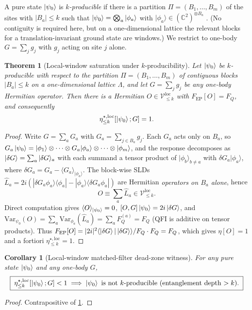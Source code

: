 \documentclass[11pt,a4paper]{article}
\newcommand{\FQ}{F_Q}
\newcommand{\FEP}{F_{\mathrm{EP}}}
\newcommand{\Var}{\mathrm{Var}}
\newcommand{\SLD}{\hat{L}}
\newcommand{\PsiZ}{\ket{\psi_0}}
\newcommand{\dG}{\ket{\delta G}}
\newcommand{\Vloc}[1]{\mathcal{V}^{\mathrm{loc}}_{\le #1}}
\newcommand{\etaloc}[1]{\eta^{\star,\mathrm{loc}}_{\le #1}}
\newtheorem{theorem}{Theorem}
\newtheorem{corollary}{Corollary}
\begin{document}
A pure state $\PsiZ$ is \emph{$k$-producible} if there is a
partition $\Pi=(B_1,\dots,B_m)$ of the sites with $|B_a|\le k$
such that $\PsiZ=\bigotimes_a|\phi_a\rangle$ with
$|\phi_a\rangle\in(\mathbb C^2)^{\otimes B_a}$
\cite{Guhne2005,Sorensen2001,Hyllus2012,Toth2012}.  (No
contiguity is required here, but on a one-dimensional lattice the
relevant blocks for a translation-invariant ground state are
windows.)  We restrict to one-body $G=\sum_jg_j$ with $g_j$
acting on site $j$ alone.

\begin{theorem}[Local-window saturation under $k$-producibility]
\label{thm:saturation}
Let $\PsiZ$ be $k$-producible with respect to the partition
$\Pi=(B_1,\dots,B_m)$ of contiguous blocks $|B_a|\le k$ on a
one-dimensional lattice $\Lambda$, and let $G=\sum_jg_j$ be any
one-body Hermitian operator.  Then there is a Hermitian
$O\in\Vloc{k}$ with $\FEP[O]=\FQ$, and consequently
\begin{equation}
   \etaloc{k}[\PsiZ;G]=1.
\end{equation}
\end{theorem}
\begin{proof}
Write $G=\sum_aG_a$ with $G_a=\sum_{j\in B_a}g_j$.  Each
$G_a$ acts only on $B_a$, so $G_a\PsiZ=
|\phi_1\rangle\otimes\dots\otimes G_a|\phi_a\rangle\otimes\dots
\otimes|\phi_m\rangle$, and the response decomposes as
$\dG=\sum_a|\delta G\rangle_a$ with each summand a tensor product
of $|\phi_b\rangle_{b\neq a}$ with $\delta G_a|\phi_a\rangle$,
where $\delta G_a=G_a-\langle G_a\rangle_{|\phi_a\rangle}$.
The block-wise SLDs $\SLD_a=2i(|\delta G_a\phi_a\rangle\langle\phi_a|-
|\phi_a\rangle\langle\delta G_a\phi_a|)$ are Hermitian
\emph{operators on $B_a$ alone}, hence
\begin{equation}
   O\equiv\sum_a\SLD_a\in\Vloc{k}.
\end{equation}
Direct computation gives
$\langle O\rangle_{\PsiZ}=0$,
$[O,G]\PsiZ=2i\dG$, and
$\Var_{\psi_0}(O)=\sum_a\Var_{\phi_a}(\SLD_a)=\sum_a\FQ^{(a)}=\FQ$
(QFI is additive on tensor products).  Thus
$\FEP[O]=|2i|^2\langle\dG|\dG\rangle/\FQ\cdot\FQ=\FQ$, which gives
$\eta[O]=1$ and a fortiori $\etaloc{k}=1$.
\end{proof}

\begin{corollary}[Local-window matched-filter dead-zone witness]
\label{cor:dead_zone}
For any pure state $\PsiZ$ and any one-body $G$,
\begin{equation}
   \boxed{\;\etaloc{k}[\PsiZ;G]<1\;\Longrightarrow\;
   \PsiZ\text{ is not $k$-producible (entanglement depth $>k$)}.\;}
   \label{eq:dead_zone}
\end{equation}
\end{corollary}
\begin{proof}
Contrapositive of \cref{thm:saturation}.
\end{proof}
\end{document}
